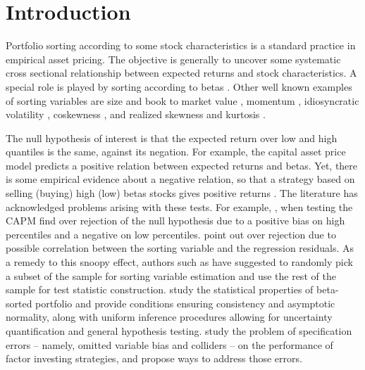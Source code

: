 
\section{Introduction}
\label{Introduction}

Portfolio sorting according to some stock characteristics is a standard practice in empirical asset pricing. The objective is generally to uncover some systematic cross sectional relationship between expected returns and stock characteristics. A special role is played by sorting according to betas \citep{fama1973risk}. Other well known examples of sorting variables are size and book to market value \citep{fama1993common}, momentum \citep{jegadeesh1993returns}, idiosyncratic volatility \citep{ang2006cross}, coskewness \citep{harvey2000conditional}, and realized skewness and kurtosis \citep{amaya2015does}. 

The null hypothesis of interest is that the expected return over low and high quantiles is the same, against its negation. For example, the capital asset price model \citep{sharpe1964capital, lintner1965valuation} predicts a positive relation between expected returns and betas. Yet, there is some empirical evidence about a negative relation, so that a strategy based on selling (buying) high (low) betas stocks gives positive returns \citep{frazzini2014betting}. The literature has acknowledged problems arising with these tests. For example, \cite{fama1973risk}, when testing the CAPM find over rejection of the null hypothesis due to a positive bias on high percentiles and a negative on low percentiles. \cite{lo1988stock} point out over rejection due to possible correlation between the sorting variable and the regression residuals. As a remedy to this snoopy effect, authors such as \cite{liang2000portfolio} have suggested to randomly pick a subset of the sample for sorting variable estimation and use the rest of the sample for test statistic construction. \cite{cattaneo2022beta} study the statistical properties of beta-sorted portfolio and provide conditions ensuring consistency and asymptotic normality, along with uniform inference procedures allowing for uncertainty quantification and general hypothesis testing. \cite{lopez2024has} study the problem of specification errors -- namely, omitted variable bias and colliders -- on the performance of factor investing strategies, and propose ways to address those errors.

